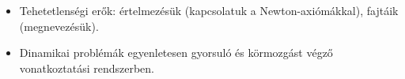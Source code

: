 \documentclass[../fizika.tex]{subfiles}
\begin{document}
    \begin{itemize}
        \item Tehetetlenségi erők: értelmezésük (kapcsolatuk a Newton-axiómákkal), fajtáik (megnevezésük).
        \item Dinamikai problémák egyenletesen gyorsuló és körmozgást végző vonatkoztatási rendszerben.
    \end{itemize}
\end{document}
